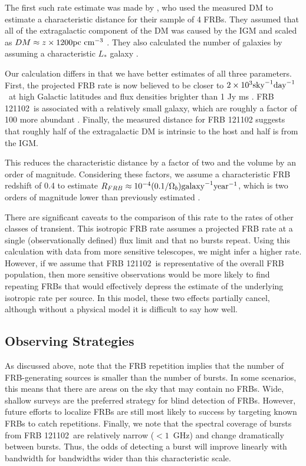 \documentclass[twocolumn]{aastex61}
\newcommand{\frb}{FRB 121102}
\begin{document}
The first such rate estimate was made by \citet{2013Sci...341...53T}, who used the measured DM to estimate a characteristic distance for their sample of 4 FRBs. They assumed that all of the extragalactic component of the DM was caused by the IGM and scaled as $DM\approx z\times1200 \rm{pc}\ \rm{cm}^{-3}$ \citep{2003ApJ...598L..79I,2004MNRAS.348..999I}. They also calculated the number of galaxies by assuming a characteristic $L_*$ galaxy \citep[corresponding to stellar mass $M_* \approx 1010.66 M$][]{2012MNRAS.421..621B}.

Our calculation differs in that we have better estimates of all three parameters. First, the projected FRB rate is now believed to be closer to $2\times10^3 \rm{sky}^{-1} \rm{day}^{-1}$\ at high Galactic latitudes and flux densities brighter than 1 Jy ms \citep{2016arXiv161100458L,2016MNRAS.460L..30C}. \frb\ is associated with a relatively small galaxy, which are roughly a factor of 100 more abundant \citep[$\Phi(M) \approx 10^{-2} \rm{Mpc}^{-3}$;][]{2007ApJ...665..265F}. Finally, the measured distance for FRB 121102 suggests that roughly half of the extragalactic DM is intrinsic to the host and half is from the IGM.

This reduces the characteristic distance by a factor of two and the volume by an order of magnitude. Considering these factors, we assume a characteristic FRB redshift of 0.4 to estimate $R_{FRB} \approx 10^{-4} (0.1/\Omega_b) \rm{galaxy}^{-1} \rm{year}^{-1}$, which is two orders of magnitude lower than previously estimated \citep[assuming isotropic radiation;]{2013Sci...341...53T}.

There are significant caveats to the comparison of this rate to the rates of other classes of transient. This isotropic FRB rate assumes a projected FRB rate at a single (observationally defined) flux limit and that no bursts repeat. Using this calculation with data from more sensitive telescopes, we might infer a higher rate. However, if we assume that \frb\ is representative of the overall FRB population, then more sensitive observations would be more likely to find repeating FRBs that would effectively depress the estimate of the underlying isotropic rate per source. In this model, these two effects partially cancel, although without a physical model it is difficult to say how well.

\subsection{Observing Strategies}
As discussed above, \citet{2016MNRAS.458L..89C} note that the FRB repetition implies that the number of FRB-generating sources is smaller than the number of bursts. In some scenarios, this means that there are areas on the sky that may contain no FRBs. Wide, shallow surveys are the preferred strategy for blind detection of FRBs. However, future efforts to localize FRBs are still most likely to success by targeting known FRBs to catch repetitions. Finally, we note that the spectral coverage of bursts from \frb\ are relatively narrow ($<1$~GHz) and change dramatically between bursts. Thus, the odds of detecting a burst will improve linearly with bandwidth for bandwidths wider than this characteristic scale.
\end{document}
